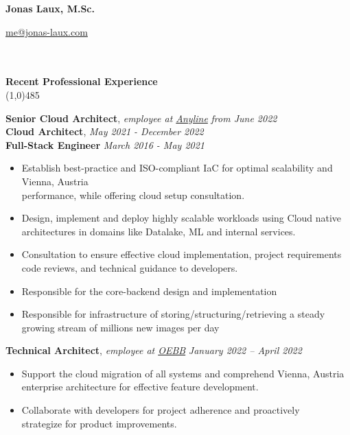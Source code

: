\documentclass[9pt]{extarticle}
\newcommand\negativespace[1][-0.12cm]{\hspace*{#1}}
\begin{document}
\centerline{{\LARGE \bf Jonas Laux, M.Sc.}}
\centerline{\href{mailto:me@jonas-laux.com}{me@jonas-laux.com}}


\noindent %
\\\\
\vspace*{-6pt}
{\negativespace \Large \bf Recent Professional Experience}\\
\line(1,0){485}
\\
\noindent

\noindent
{\bf Senior Cloud Architect}, \textit{employee at \href{https://anyline.com}{Anyline}}  \hfill \textit{from June 2022} \\
{\bf Cloud Architect}, \hfill \textit{May 2021 - December 2022} \\
{\bf Full-Stack Engineer} \hfill \textit{March 2016 - May 2021}
\begin{itemize}
\setlength\itemsep{0.05em}
\item Establish best-practice and ISO-compliant IaC for optimal scalability and \hfill Vienna, Austria \\
performance, while offering cloud setup consultation.
\item Design, implement and deploy highly scalable workloads using Cloud native \\
architectures in domains like Datalake, ML and internal services.
\item Consultation to ensure effective cloud implementation, project requirements \\
code reviews, and technical guidance to developers.
\item Responsible for the core-backend design and implementation
\item Responsible for infrastructure of storing/structuring/retrieving a steady \\ 
growing stream of millions new images per day
\end{itemize}

\noindent
{\bf Technical Architect}, \textit{employee at \href{https://www.oebb.at/}{OEBB}}  \hfill \textit{January 2022 -- April 2022}
\begin{itemize}
\setlength\itemsep{0.05em}
\item Support the cloud migration of all systems and comprehend \hfill Vienna, Austria \\
enterprise architecture for effective feature development.
\item Collaborate with developers for project adherence and proactively \\ 
strategize for product improvements.
\end{itemize}
\end{document}
